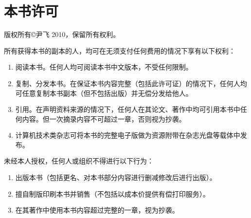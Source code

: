 \section{本书许可}
版权所有©尹飞 2010，保留所有权利。

所有获得本书的副本的人，均可在无须支付任何费用的情况下享有以下权利：
\begin{enumerate}
\item 阅读本书。任何人均可阅读本书中文版本，不受任何限制。
\item 复制、分发本书。在保证本书内容完整（包括此许可证）的情况下，任何人均可任意复制本书副本（但不包括出版）并无偿分发给他人。
\item 引用。在声明资料来源的情况下，任何人在其论文、著作中均可引用本书中任何内容。但一次摘录内容不可超过一章，否则视为抄袭。
\item 计算机技术类杂志可将本书的完整电子版做为资源附带在杂志光盘等载体中发布。
\end{enumerate}
未经本人授权，任何人或组织不得进行以下行为： 
\begin{enumerate}
\item 出版本书（包括更名、对本书部分内容进行删减修改后进行出版）。
\item 擅自制版印刷本书并销售（不包括以成本价提供有偿打印服务）。
\item 在其著作中使用本书内容超过完整的一章，视为抄袭。
\end{enumerate}
\newpage
\thispagestyle{empty}
